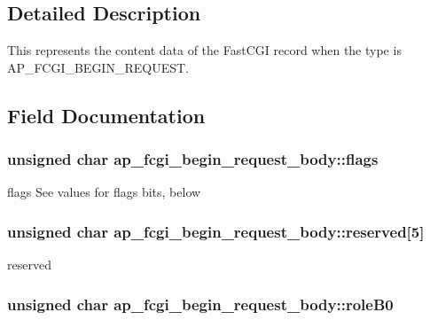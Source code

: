 \subsection{Detailed Description}
This represents the content data of the Fast\+C\+GI record when the type is A\+P\+\_\+\+F\+C\+G\+I\+\_\+\+B\+E\+G\+I\+N\+\_\+\+R\+E\+Q\+U\+E\+ST. 

\subsection{Field Documentation}
\subsubsection[{\texorpdfstring{flags}{flags}}]{\setlength{\rightskip}{0pt plus 5cm}unsigned char ap\+\_\+fcgi\+\_\+begin\+\_\+request\+\_\+body\+::flags}\hypertarget{structap__fcgi__begin__request__body_a9198bcd21f9527acba43ee1fb146c258}{}\label{structap__fcgi__begin__request__body_a9198bcd21f9527acba43ee1fb146c258}
flags See values for flags bits, below 
\subsubsection[{\texorpdfstring{reserved}{reserved}}]{\setlength{\rightskip}{0pt plus 5cm}unsigned char ap\+\_\+fcgi\+\_\+begin\+\_\+request\+\_\+body\+::reserved\mbox{[}5\mbox{]}}\hypertarget{structap__fcgi__begin__request__body_aff94fc13a2fc93e3781c3ed60df2a357}{}\label{structap__fcgi__begin__request__body_aff94fc13a2fc93e3781c3ed60df2a357}
reserved 
\subsubsection[{\texorpdfstring{role\+B0}{roleB0}}]{\setlength{\rightskip}{0pt plus 5cm}unsigned char ap\+\_\+fcgi\+\_\+begin\+\_\+request\+\_\+body\+::role\+B0}\hypertarget{structap__fcgi__begin__request__body_a89c56a6c47ab48884e0ed4f2a9a2f457}{}\label{structap__fcgi__begin__request__body_a89c56a6c47ab48884e0ed4f2a9a2f457}
